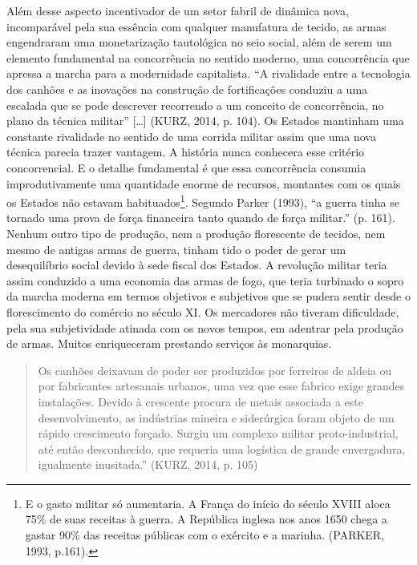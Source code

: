 Além desse aspecto incentivador de um setor fabril de dinâmica nova,
incomparável pela sua essência com qualquer manufatura de tecido, as
armas engendraram uma monetarização tautológica no seio social, além de
serem um elemento fundamental na concorrência no sentido moderno, uma
concorrência que apressa a marcha para a modernidade capitalista. ``A
rivalidade entre a tecnologia dos canhões e as inovações na construção
de fortificações conduziu a uma escalada que se pode descrever
recorrendo a um conceito de concorrência, no plano da técnica militar''
{[}\ldots{}{]} (KURZ, 2014, p. 104). Os Estados mantinham uma constante
rivalidade no sentido de uma corrida militar assim que uma nova técnica
parecia trazer vantagem. A história nunca conhecera esse critério
concorrencial. E o detalhe fundamental é que essa concorrência consumia
improdutivamente uma quantidade enorme de recursos, montantes com os
quais os Estados não estavam habituados\footnote{E o gasto militar só
  aumentaria. A França do início do século XVIII aloca 75\% de suas
  receitas à guerra. A República inglesa nos anos 1650 chega a gastar
  90\% das receitas públicas com o exército e a marinha. (PARKER, 1993,
  p.161).}. Segundo Parker (1993), ``a guerra tinha se tornado uma prova
de força financeira tanto quando de força militar.'' (p. 161). Nenhum
outro tipo de produção, nem a produção florescente de tecidos, nem mesmo
de antigas armas de guerra, tinham tido o poder de gerar um
desequilíbrio social devido à sede fiscal dos Estados. A revolução
militar teria assim conduzido a uma economia das armas de fogo, que
teria turbinado o sopro da marcha moderna em termos objetivos e
subjetivos que se pudera sentir desde o florescimento do comércio no
século XI. Os mercadores não tiveram dificuldade, pela sua subjetividade
atinada com os novos tempos, em adentrar pela produção de armas. Muitos
enriqueceram prestando serviços às monarquias.

\begin{quote}
Os canhões deixavam de poder ser produzidos por ferreiros de aldeia ou
por fabricantes artesanais urbanos, uma vez que esse fabrico exige
grandes instalações. Devido à crescente procura de metais associada a
este desenvolvimento, as indústrias mineira e siderúrgica foram objeto
de um rápido crescimento forçado. Surgiu um complexo militar
proto-industrial, até então desconhecido, que requeria uma logística de
grande envergadura, igualmente inusitada.'' (KURZ, 2014, p. 105)
\end{quote}

